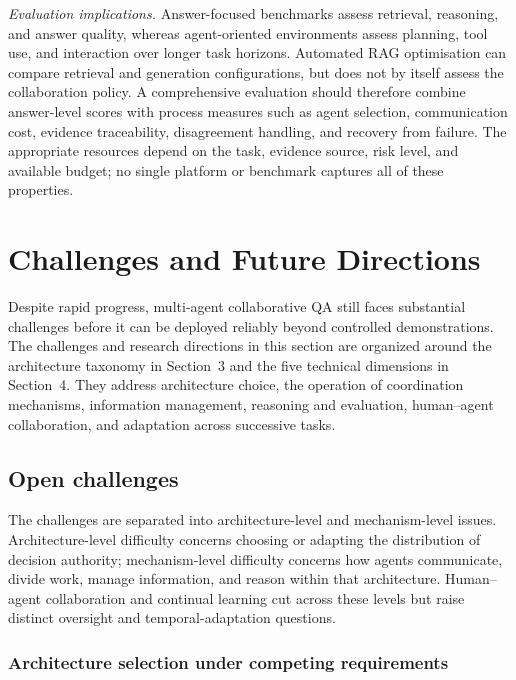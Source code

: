 \documentclass[a4paper,fleqn]{cas-dc}
\begin{document}
\emph{Evaluation implications.} Answer-focused benchmarks assess retrieval,
reasoning, and answer quality, whereas agent-oriented environments assess
planning, tool use, and interaction over longer task horizons. Automated RAG
optimisation can compare retrieval and generation configurations, but does not
by itself assess the collaboration policy. A comprehensive evaluation should
therefore combine answer-level scores with process measures such as agent
selection, communication cost, evidence traceability, disagreement handling,
and recovery from failure. The appropriate resources depend on the task,
evidence source, risk level, and available budget; no single platform or
benchmark captures all of these properties.
\section{Challenges and Future Directions}
\label{sec:discussion}

Despite rapid progress, multi-agent collaborative QA still faces substantial
challenges before it can be deployed reliably beyond controlled demonstrations.
The challenges and research directions in this section are organized around
the architecture taxonomy in Section~3 and the five technical dimensions in
Section~4. They address architecture choice, the operation of coordination
mechanisms, information management, reasoning and evaluation, human--agent
collaboration, and adaptation across successive tasks.

\subsection{Open challenges}
\label{sec:open_challenges}

The challenges are separated into architecture-level and mechanism-level
issues. Architecture-level difficulty concerns choosing or adapting the
distribution of decision authority; mechanism-level difficulty concerns how
agents communicate, divide work, manage information, and reason within that
architecture. Human--agent collaboration and continual learning cut across
these levels but raise distinct oversight and temporal-adaptation questions.

\subsubsection{Architecture selection under competing requirements}
\label{sec:architecture_challenges}
\end{document}
